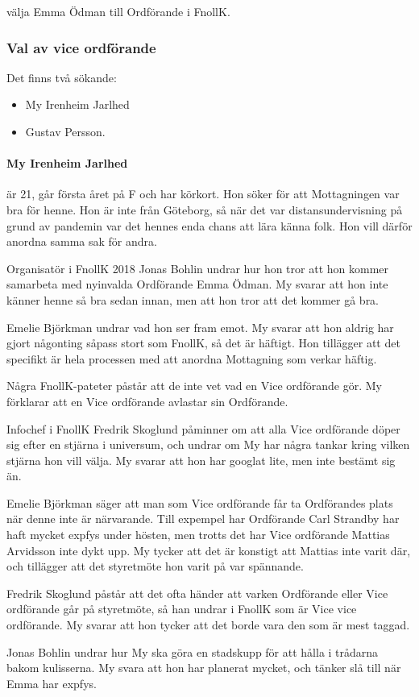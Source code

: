 \documentclass[hidelinks]{sektionsmote} %
\begin{document}
\begin{beslut}
  \item välja Emma Ödman till Ordförande i FnollK.
\end{beslut}

\subsubsection{Val av vice ordförande}
Det finns två sökande:
\begin{itemize}
    \item My Irenheim Jarlhed
    \item Gustav Persson.
\end{itemize}

\paragraph{My Irenheim Jarlhed} är 21, går första året på F och har körkort.
Hon söker för att Mottagningen var bra för henne.
Hon är inte från Göteborg, så när det var distansundervisning på grund av pandemin var det hennes enda chans att lära känna folk.
Hon vill därför anordna samma sak för andra.\par
Organisatör i FnollK 2018 Jonas Bohlin undrar hur hon tror att hon kommer samarbeta med nyinvalda Ordförande Emma Ödman.
My svarar att hon inte känner henne så bra sedan innan, men att hon tror att det kommer gå bra.\par
Emelie Björkman undrar vad hon ser fram emot.
My svarar att hon aldrig har gjort någonting såpass stort som FnollK, så det är häftigt.
Hon tillägger att det specifikt är hela processen med att anordna Mottagning som verkar häftig.\par
Några FnollK-pateter påstår att de inte vet vad en Vice ordförande gör.
My förklarar att en Vice ordförande avlastar sin Ordförande.\par
Infochef i FnollK Fredrik Skoglund påminner om att alla Vice ordförande döper sig efter en stjärna i universum, och undrar om My har några tankar kring vilken stjärna hon vill välja.
My svarar att hon har googlat lite, men inte bestämt sig än.\par
Emelie Björkman säger att man som Vice ordförande får ta Ordförandes plats när denne inte är närvarande.
Till expempel har Ordförande Carl Strandby har haft mycket expfys under hösten, men trotts det har Vice ordförande Mattias Arvidsson inte dykt upp.
My tycker att det är konstigt att Mattias inte varit där, och tillägger att det styretmöte hon varit på var spännande.\par
Fredrik Skoglund påstår att det ofta händer att varken Ordförande eller Vice ordförande går på styretmöte, så han undrar i FnollK som är Vice vice ordförande.
My svarar att hon tycker att det borde vara den som är mest taggad.\par
Jonas Bohlin undrar hur My ska göra en stadskupp för att hålla i trådarna bakom kulisserna.
My svara att hon har planerat mycket, och tänker slå till när Emma har expfys.
\end{document}
